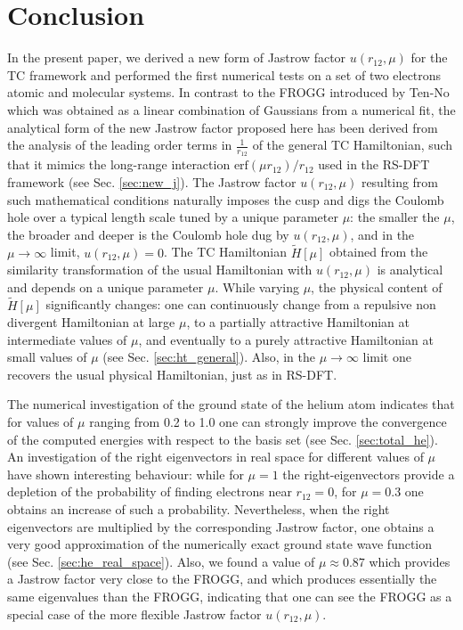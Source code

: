 \documentclass[aip,jcp,reprint,noshowkeys,superscriptaddress]{revtex4-1}
\begin{document}
\section{Conclusion}
In the present paper, we derived a new form of Jastrow factor $u(r_{12},\mu)$ for the TC framework and performed the first numerical tests on a set of two electrons atomic and molecular systems. 
In contrast to the FROGG introduced by Ten-No\cite{TenNo-CPL-00-a} which was obtained as a linear combination of Gaussians from a numerical fit, the analytical form of the new Jastrow factor proposed here has been derived from the analysis of the leading order terms in $\frac{1}{r_{12}}$ of the general TC Hamiltonian, such that it mimics the long-range interaction $\text{erf}(\mu r_{12})/r_{12}$ used in the RS-DFT framework (see Sec. \ref{sec:new_j}). 
The Jastrow factor $u(r_{12},\mu)$ resulting from such mathematical conditions naturally imposes the cusp and digs the Coulomb hole over a typical length scale tuned by a unique parameter $\mu$: the smaller the $\mu$, the broader and deeper is the Coulomb hole dug by $u(r_{12},\mu)$, and in the $\mu \rightarrow \infty$ limit, $u(r_{12},\mu)=0$. 
The TC Hamiltonian $\tilde{H}[\mu]$ obtained from the similarity transformation of the usual Hamiltonian with $u(r_{12},\mu)$ is analytical and depends on a unique parameter $\mu$. 
While varying $\mu$, the physical content of $\tilde{H}[\mu]$ significantly changes: one can continuously change from a repulsive non divergent Hamiltonian at large $\mu$, to a partially attractive Hamiltonian at intermediate values of $\mu$, and eventually to a purely attractive Hamiltonian at small values of $\mu$ (see Sec. \ref{sec:ht_general}). 
Also, in the $\mu \rightarrow \infty$ limit one recovers the usual physical Hamiltonian, just as in RS-DFT. 
 
The numerical investigation of the ground state of the helium atom indicates that for values of $\mu$ ranging from 0.2 to 1.0 one can strongly improve the convergence of the computed energies with respect to the basis set (see Sec. \ref{sec:total_he}). An investigation of the right eigenvectors in real space for different values of $\mu$ have shown interesting behaviour: while for $\mu=1$ the right-eigenvectors provide a depletion of the probability of finding electrons near $r_{12}=0$, for $\mu=0.3$ one obtains an increase of such a probability. 
Nevertheless, when the right eigenvectors are multiplied by the corresponding Jastrow factor, one obtains a very good approximation of the numerically exact ground state wave function (see Sec. \ref{sec:he_real_space}).  
Also, we found a value of $\mu \approx 0.87$ which provides a Jastrow factor very close to the FROGG, and which produces essentially the same eigenvalues than the FROGG, indicating that one can see the FROGG as a special case of the more flexible Jastrow factor $u(r_{12},\mu)$. 
\end{document}
